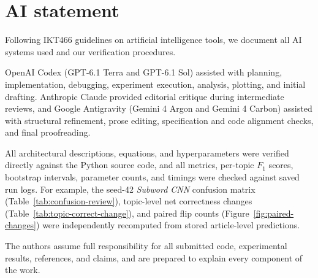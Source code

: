 \chapter{AI statement}\label{app:ai}
Following IKT466 guidelines on artificial intelligence tools, we document all AI systems used and our verification procedures.

OpenAI Codex (GPT-6.1 Terra and GPT-6.1 Sol) assisted with planning, implementation, debugging, experiment execution, analysis, plotting, and initial drafting. Anthropic Claude provided editorial critique during intermediate reviews, and Google Antigravity (Gemini 4 Argon and Gemini 4 Carbon) assisted with structural refinement, prose editing, specification and code alignment checks, and final proofreading.

All architectural descriptions, equations, and hyperparameters were verified directly against the Python source code, and all metrics, per-topic $F_1$ scores, bootstrap intervals, parameter counts, and timings were checked against saved run logs. For example, the seed-42 \textit{Subword CNN} confusion matrix (Table~\ref{tab:confusion-review}), topic-level net correctness changes (Table~\ref{tab:topic-correct-change}), and paired flip counts (Figure~\ref{fig:paired-changes}) were independently recomputed from stored article-level predictions.

The authors assume full responsibility for all submitted code, experimental results, references, and claims, and are prepared to explain every component of the work.
